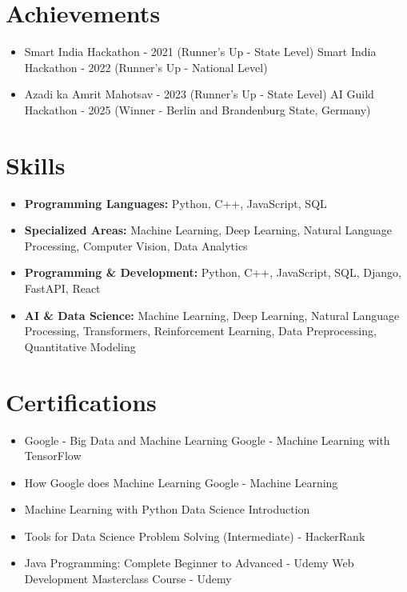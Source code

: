 \documentclass[a4paper,10pt]{article}
\begin{document}
\section*{Achievements}
\begin{itemize}
\item Smart India Hackathon - 2021 (Runner's Up - State Level) \hfill Smart India Hackathon - 2022 (Runner's Up - National Level)
\item Azadi ka Amrit Mahotsav - 2023 (Runner's Up - State Level) \hfill AI Guild Hackathon - 2025 (Winner - Berlin and Brandenburg State, Germany)
\end{itemize}

\section*{Skills}
\begin{itemize}
  \item \textbf{Programming Languages:} Python, C++, JavaScript, SQL
  \item \textbf{Specialized Areas:} Machine Learning, Deep Learning, Natural Language Processing, Computer Vision, Data Analytics
  \item \textbf{Programming \& Development:} Python, C++, JavaScript, SQL, Django, FastAPI, React
  \item \textbf{AI \& Data Science:} Machine Learning, Deep Learning, Natural Language Processing, Transformers, Reinforcement Learning, Data Preprocessing, Quantitative Modeling
\end{itemize}

\section*{Certifications}
\begin{itemize}
\item Google - Big Data and Machine Learning \hfill Google - Machine Learning with TensorFlow
\item How Google does Machine Learning \hfill Google - Machine Learning
\item Machine Learning with Python \hfill Data Science Introduction
\item Tools for Data Science \hfill Problem Solving (Intermediate) - HackerRank
\item Java Programming: Complete Beginner to Advanced - Udemy \hfill Web Development Masterclass Course - Udemy
\end{itemize}
\end{document}

